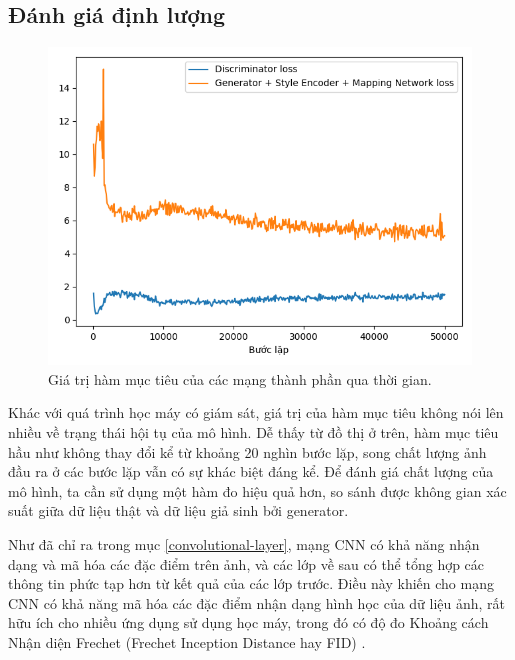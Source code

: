 \documentclass[12pt]{extreport}
\begin{document}
\subsection{Đánh giá định lượng}

\begin{figure}[H]
    \centering
    \includegraphics[width=\linewidth]{figure40.png}
    \caption{Giá trị hàm mục tiêu của các mạng thành phần qua thời gian.}
\end{figure}

Khác với quá trình học máy có giám sát, giá trị của hàm mục tiêu không nói lên nhiều về trạng thái hội tụ của mô hình. Dễ thấy từ đồ thị ở trên, hàm mục tiêu hầu như không thay đổi kể từ khoảng 20 nghìn bước lặp, song chất lượng ảnh đầu ra ở các bước lặp vẫn có sự khác biệt đáng kể. Để đánh giá chất lượng của mô hình, ta cần sử dụng một hàm đo hiệu quả hơn, so sánh được không gian xác suất giữa dữ liệu thật và dữ liệu giả sinh bởi generator.

Như đã chỉ ra trong mục \ref{convolutional-layer}, mạng CNN có khả năng nhận dạng và mã hóa các đặc điểm trên ảnh, và các lớp về sau có thể tổng hợp các thông tin phức tạp hơn từ kết quả của các lớp trước. Điều này khiến cho mạng CNN có khả năng mã hóa các đặc điểm nhận dạng hình học của dữ liệu ảnh, rất hữu ích cho nhiều ứng dụng sử dụng học máy, trong đó có độ đo Khoảng cách Nhận diện Frechet (Frechet Inception Distance hay FID) \cite{DBLP:journals/corr/HeuselRUNKH17}.
\end{document}
